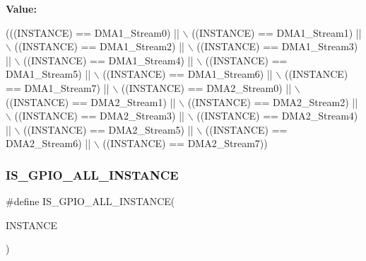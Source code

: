 {\bfseries Value\+:}
\begin{DoxyCode}
(((INSTANCE) == DMA1\_Stream0) || \(\backslash\)
                                              ((INSTANCE) == DMA1\_Stream1) || \(\backslash\)
                                              ((INSTANCE) == DMA1\_Stream2) || \(\backslash\)
                                              ((INSTANCE) == DMA1\_Stream3) || \(\backslash\)
                                              ((INSTANCE) == DMA1\_Stream4) || \(\backslash\)
                                              ((INSTANCE) == DMA1\_Stream5) || \(\backslash\)
                                              ((INSTANCE) == DMA1\_Stream6) || \(\backslash\)
                                              ((INSTANCE) == DMA1\_Stream7) || \(\backslash\)
                                              ((INSTANCE) == DMA2\_Stream0) || \(\backslash\)
                                              ((INSTANCE) == DMA2\_Stream1) || \(\backslash\)
                                              ((INSTANCE) == DMA2\_Stream2) || \(\backslash\)
                                              ((INSTANCE) == DMA2\_Stream3) || \(\backslash\)
                                              ((INSTANCE) == DMA2\_Stream4) || \(\backslash\)
                                              ((INSTANCE) == DMA2\_Stream5) || \(\backslash\)
                                              ((INSTANCE) == DMA2\_Stream6) || \(\backslash\)
                                              ((INSTANCE) == DMA2\_Stream7))
\end{DoxyCode}
\mbox{\label{group___exported__macros_ga783626dd2431afebea836a102e318957}} 
\subsubsection{\texorpdfstring{I\+S\+\_\+\+G\+P\+I\+O\+\_\+\+A\+L\+L\+\_\+\+I\+N\+S\+T\+A\+N\+CE}{IS\_GPIO\_ALL\_INSTANCE}}
{\footnotesize\ttfamily \#define I\+S\+\_\+\+G\+P\+I\+O\+\_\+\+A\+L\+L\+\_\+\+I\+N\+S\+T\+A\+N\+CE(\begin{DoxyParamCaption}\item[{}]{I\+N\+S\+T\+A\+N\+CE }\end{DoxyParamCaption})}

